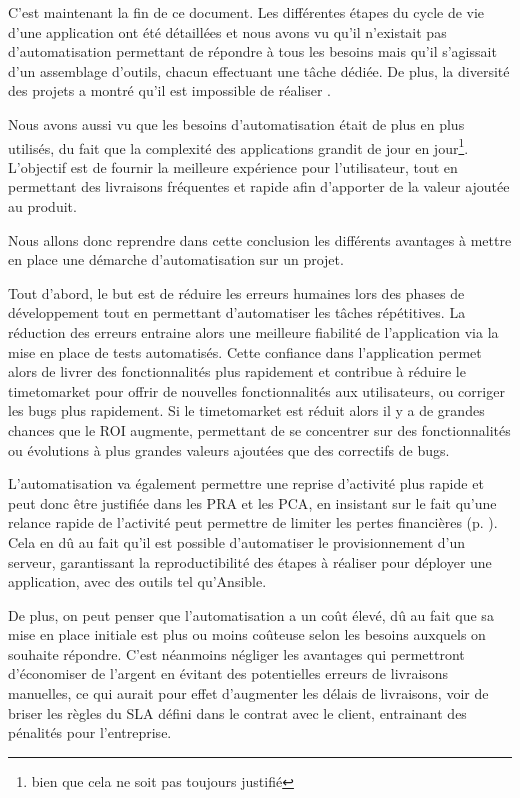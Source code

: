 C'est maintenant la fin de ce document. Les différentes étapes du cycle de vie d'une application ont été détaillées et nous avons vu qu'il n'existait pas d'automatisation  permettant de répondre à tous les besoins mais qu'il s'agissait d'un assemblage d'outils, chacun effectuant une tâche dédiée. De plus, la diversité des projets a montré qu'il est impossible de réaliser .

Nous avons aussi vu que les besoins d'automatisation était de plus en plus utilisés, du fait que la complexité des applications grandit de jour en jour\footnote{bien que cela ne soit pas toujours justifié}. L'objectif est de fournir la meilleure expérience pour l'utilisateur, tout en permettant des livraisons fréquentes et rapide afin d'apporter de la valeur ajoutée au produit.

Nous allons donc reprendre dans cette conclusion les différents avantages à mettre en place une démarche d'automatisation sur un projet.

Tout d'abord, le but est de réduire les erreurs humaines lors des phases de développement tout en permettant d'automatiser les tâches répétitives. La réduction des erreurs entraine alors une meilleure fiabilité de l'application via la mise en place de tests automatisés. Cette confiance dans l'application permet alors de livrer des fonctionnalités plus rapidement et contribue à réduire le \gls{timetomarket} pour offrir de nouvelles fonctionnalités aux utilisateurs, ou corriger les bugs plus rapidement. Si le \gls{timetomarket} est réduit alors il y a de grandes chances que le \gls{ROI} augmente, permettant de se concentrer sur des fonctionnalités ou évolutions à plus grandes valeurs ajoutées que des correctifs de bugs.

L'automatisation va également permettre une reprise d'activité plus rapide et peut donc être justifiée dans les \gls{PRA} et les \gls{PCA}, en insistant sur le fait qu'une relance rapide de l'activité peut permettre de limiter les pertes financières (p. \pageref{ref-pra}). Cela en dû au fait qu'il est possible d'automatiser le provisionnement d'un serveur, garantissant la reproductibilité des étapes à réaliser pour déployer une application, avec des outils tel qu'Ansible.

De plus, on peut penser que l'automatisation a un coût élevé, dû au fait que sa mise en place initiale est plus ou moins coûteuse selon les besoins auxquels on souhaite répondre. C'est néanmoins négliger les avantages qui permettront d'économiser de l'argent en évitant des potentielles erreurs de livraisons manuelles, ce qui aurait pour effet d'augmenter les délais de livraisons, voir de briser les règles du \gls{SLA} défini dans le contrat avec le client, entrainant des pénalités pour l'entreprise.


